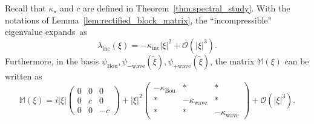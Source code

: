 \documentclass[AHL,Unicode,longabstracts,published]{cedram}
\newcommand{\Wave}{\mathrm{wave}}
\newcommand{\Inc}{\mathrm{inc}}
\newcommand{\Bou}{\mathrm{Bou}}
\newcommand{\rectsL}{\mathbb{M}}
\newcommand{\OO}{\mathcal{O}}
\begin{document}
\begin{lemm}\label{lem:expansion_rectified_matrix}
Recall that $\kappa_\star$ and $c$ are defined in Theorem~\ref{thm:spectral_study}. With the notations of Lemma~\ref{lem:rectified_block_matrix}, the ``incompressible'' eigenvalue expands~as
\begin{equation*}
\lambda_\Inc(\xi) = - \kappa_\Inc | \xi |^2 + \OO\left(| \xi |^3 \right).
\end{equation*}
Furthermore, in the basis $\psi_{\Bou}, \psi_{- \Wave}(\widetilde{\xi}), \psi_{ + \Wave}(\widetilde{\xi})$, the matrix $\rectsL(\xi)$ can be written as
\begin{equation}\label{eq:expansion_rectified_matrix}
\rectsL(\xi) = i | \xi |
\left(
\begin{matrix}
0 & 0 & 0 \\
0 & c & 0 \\
0 & 0 & - c
\end{matrix}
\right) + | \xi |^2 \left(
\begin{matrix}
- \kappa_\Bou & * & * \\
* & - \kappa_{\Wave} & * \\
* & * & - \kappa_{\Wave}
\end{matrix}
\right) + \OO\left(| \xi |^3 \right).
\end{equation}
\end{lemm}
\end{document}
